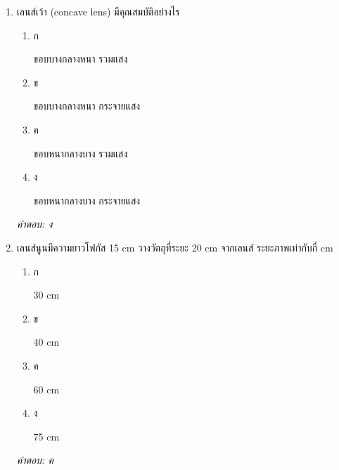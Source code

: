 \documentclass[12pt]{article}
\begin{document}
\begin{enumerate}[label=\arabic*., itemsep=0.5\baselineskip, topsep=0.5\baselineskip, leftmargin=*]
\item เลนส์เว้า (concave lens) มีคุณสมบัติอย่างไร
\begin{enumerate}[label=\alph*)., itemsep=0.3\baselineskip, topsep=0.3\baselineskip]
\item ก\ 
\begin{minipage}[t]{0.9\linewidth}
\raggedright ขอบบางกลางหนา รวมแสง
\end{minipage}
\item ข\ 
\begin{minipage}[t]{0.9\linewidth}
\raggedright ขอบบางกลางหนา กระจายแสง
\end{minipage}
\item ค\ 
\begin{minipage}[t]{0.9\linewidth}
\raggedright ขอบหนากลางบาง รวมแสง
\end{minipage}
\item ง\ 
\begin{minipage}[t]{0.9\linewidth}
\raggedright ขอบหนากลางบาง กระจายแสง
\end{minipage}
\end{enumerate}
\vspace{-0.3\baselineskip}
\begin{small}
\textit{คำตอบ: ง}
\end{small}

\item เลนส์นูนมีความยาวโฟกัส 15 cm วางวัตถุที่ระยะ 20 cm จากเลนส์ ระยะภาพเท่ากับกี่ cm
\begin{enumerate}[label=\alph*)., itemsep=0.3\baselineskip, topsep=0.3\baselineskip]
\item ก\ 
\begin{minipage}[t]{0.9\linewidth}
\raggedright 30 cm
\end{minipage}
\item ข\ 
\begin{minipage}[t]{0.9\linewidth}
\raggedright 40 cm
\end{minipage}
\item ค\ 
\begin{minipage}[t]{0.9\linewidth}
\raggedright 60 cm
\end{minipage}
\item ง\ 
\begin{minipage}[t]{0.9\linewidth}
\raggedright 75 cm
\end{minipage}
\end{enumerate}
\vspace{-0.3\baselineskip}
\begin{small}
\textit{คำตอบ: ค}
\end{small}

\end{enumerate}
\end{document}

